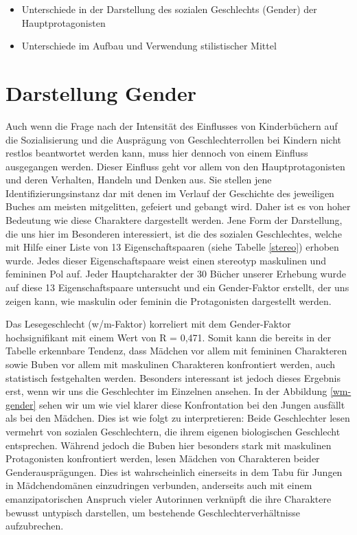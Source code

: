 \begin{itemize}
\item
  Unterschiede in der Darstellung des sozialen Geschlechts (Gender) der
  Hauptprotagonisten
\item
  Unterschiede im Aufbau und Verwendung stilistischer Mittel
\end{itemize}

\section{Darstellung Gender}

Auch wenn die Frage nach der Intensität des Einflusses von Kinderbüchern
auf die Sozialisierung und die Ausprägung von Geschlechterrollen bei
Kindern nicht restlos beantwortet werden kann, muss hier dennoch von
einem Einfluss ausgegangen werden. Dieser Einfluss geht vor allem von
den Hauptprotagonisten und deren Verhalten, Handeln und Denken aus. Sie
stellen jene Identifizierungsinstanz dar mit denen im Verlauf der
Geschichte des jeweiligen Buches am meisten mitgelitten, gefeiert und
gebangt wird. Daher ist es von hoher Bedeutung wie diese Charaktere
dargestellt werden. Jene Form der Darstellung, die uns hier im
Besonderen interessiert, ist die des sozialen Geschlechtes, welche mit
Hilfe einer Liste von 13 Eigenschaftspaaren (siehe Tabelle \ref{stereo})
erhoben wurde. Jedes dieser Eigenschaftspaare weist einen stereotyp
maskulinen und femininen Pol auf. Jeder Hauptcharakter der 30 Bücher
unserer Erhebung wurde auf diese 13 Eigenschaftspaare untersucht und ein
Gender-Faktor erstellt, der uns zeigen kann, wie maskulin oder feminin
die Protagonisten dargestellt werden.



Das Lesegeschlecht (w/m-Faktor) korreliert mit dem Gender-Faktor
hochsignifikant mit einem Wert von R = 0,471. Somit kann die bereits in
der Tabelle erkennbare Tendenz, dass Mädchen vor allem mit femininen
Charakteren sowie Buben vor allem mit maskulinen Charakteren
konfrontiert werden, auch statistisch festgehalten werden. Besonders
interessant ist jedoch dieses Ergebnis erst, wenn wir uns die
Geschlechter im Einzelnen ansehen. In der Abbildung \ref{wm-gender}
sehen wir um wie viel klarer diese Konfrontation bei den Jungen ausfällt
als bei den Mädchen. Dies ist wie folgt zu interpretieren: Beide
Geschlechter lesen vermehrt von sozialen Geschlechtern, die ihrem
eigenen biologischen Geschlecht entsprechen. Während jedoch die Buben
hier besonders stark mit maskulinen Protagonisten konfrontiert werden,
lesen Mädchen von Charakteren beider Genderausprägungen. Dies ist
wahrscheinlich einerseits in dem Tabu für Jungen in Mädchendomänen
einzudringen verbunden, anderseits auch mit einem emanzipatorischen
Anspruch vieler Autorinnen verknüpft die ihre Charaktere bewusst
untypisch darstellen, um bestehende Geschlechterverhältnisse
aufzubrechen.

